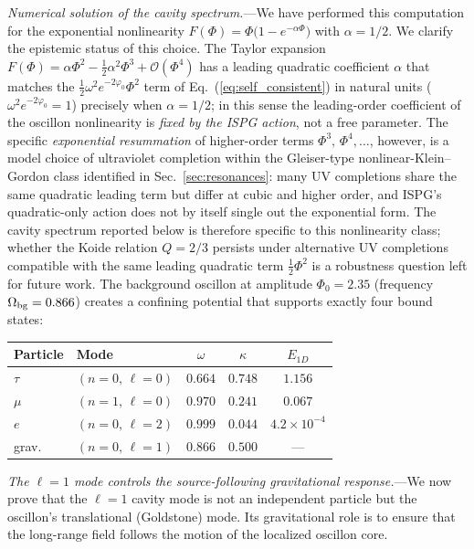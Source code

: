 \documentclass[aps,prd,onecolumn,superscriptaddress,nofootinbib,showpacs,12pt,notitlepage]{revtex4-2}
\begin{document}
\textit{Numerical solution of the cavity spectrum.}---We have
performed this computation for the exponential nonlinearity
$F(\Phi) = \Phi\bigl(1 - e^{-\alpha\Phi}\bigr)$ with
$\alpha = 1/2$.  We clarify the epistemic status of this
choice.  The Taylor expansion
$F(\Phi) = \alpha\Phi^{2}
 - \tfrac{1}{2}\alpha^{2}\Phi^{3}
 + \mathcal{O}(\Phi^{4})$
has a leading quadratic coefficient $\alpha$ that matches
the $\tfrac{1}{2}\omega^{2}e^{-2\varphi_{0}}\Phi^{2}$ term
of Eq.~(\ref{eq:self_consistent}) in natural units
($\omega^{2}e^{-2\varphi_{0}} = 1$) precisely when
$\alpha = 1/2$; in this sense the leading-order coefficient
of the oscillon nonlinearity is \emph{fixed by the ISPG
action}, not a free parameter.  The specific
\emph{exponential resummation} of higher-order terms
$\Phi^{3},\,\Phi^{4},\ldots$, however, is a model choice
of ultraviolet completion within the Gleiser-type
nonlinear-Klein--Gordon class identified in
Sec.~\ref{sec:resonances}: many UV completions share the
same quadratic leading term but differ at cubic and higher
order, and ISPG's quadratic-only action does not by itself
single out the exponential form.  The cavity spectrum
reported below is therefore specific to this nonlinearity
class; whether the Koide relation $Q = 2/3$ persists under
alternative UV completions compatible with the same
leading quadratic term $\tfrac{1}{2}\Phi^{2}$ is a
robustness question left for future work.
The background oscillon at amplitude $\Phi_0 = 2.35$
(frequency $\Omega_{\rm bg} = 0.866$) creates a confining
potential that supports exactly four bound states:
\begin{center}
\begin{tabular}{llccc}
\hline
Particle & Mode & $\omega$ & $\kappa$ & $E_{1D}$ \\
\hline
$\tau$     & $(n{=}0,\,\ell{=}0)$ & $0.664$ & $0.748$ & $1.156$ \\
$\mu$      & $(n{=}1,\,\ell{=}0)$ & $0.970$ & $0.241$ & $0.067$ \\
$e$        & $(n{=}0,\,\ell{=}2)$ & $0.999$ & $0.044$ & $4.2 \times 10^{-4}$ \\
grav.      & $(n{=}0,\,\ell{=}1)$ & $0.866$ & $0.500$ & --- \\
\hline
\end{tabular}
\end{center}
\textit{The $\ell = 1$ mode controls the source-following
gravitational response.}---We now prove that the $\ell = 1$
cavity mode is not an independent particle but the oscillon's
translational (Goldstone) mode.  Its gravitational role is to
ensure that the long-range field follows the motion of the
localized oscillon core.
\end{document}
